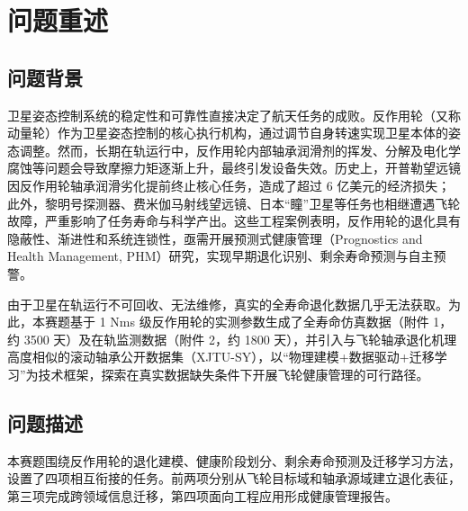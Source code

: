 \section{问题重述}

\subsection{问题背景}

卫星姿态控制系统的稳定性和可靠性直接决定了航天任务的成败。反作用轮（又称动量轮）作为卫星姿态控制的核心执行机构，通过调节自身转速实现卫星本体的姿态调整。然而，长期在轨运行中，反作用轮内部轴承润滑剂的挥发、分解及电化学腐蚀等问题会导致摩擦力矩逐渐上升，最终引发设备失效。历史上，开普勒望远镜因反作用轮轴承润滑劣化提前终止核心任务，造成了超过 6 亿美元的经济损失；此外，黎明号探测器、费米伽马射线望远镜、日本“瞳”卫星等任务也相继遭遇飞轮故障，严重影响了任务寿命与科学产出。这些工程案例表明，反作用轮的退化具有隐蔽性、渐进性和系统连锁性，亟需开展预测式健康管理（Prognostics and Health Management, PHM）研究，实现早期退化识别、剩余寿命预测与自主预警。

由于卫星在轨运行不可回收、无法维修，真实的全寿命退化数据几乎无法获取。为此，本赛题基于 1 Nms 级反作用轮的实测参数生成了全寿命仿真数据（附件 1，约 3500 天）及在轨监测数据（附件 2，约 1800 天），并引入与飞轮轴承退化机理高度相似的滚动轴承公开数据集（XJTU-SY），以“物理建模+数据驱动+迁移学习”为技术框架，探索在真实数据缺失条件下开展飞轮健康管理的可行路径。

\subsection{问题描述}

本赛题围绕反作用轮的退化建模、健康阶段划分、剩余寿命预测及迁移学习方法，设置了四项相互衔接的任务。前两项分别从飞轮目标域和轴承源域建立退化表征，第三项完成跨领域信息迁移，第四项面向工程应用形成健康管理报告。

